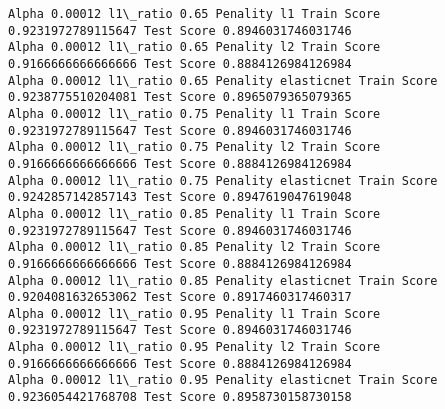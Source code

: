 \documentclass[11pt]{article}
\begin{document}
\begin{Verbatim}[commandchars=\\\{\}]
Alpha 0.00012 l1\_ratio 0.65 Penality l1 Train Score 0.9231972789115647 Test Score 0.8946031746031746
Alpha 0.00012 l1\_ratio 0.65 Penality l2 Train Score 0.9166666666666666 Test Score 0.8884126984126984
Alpha 0.00012 l1\_ratio 0.65 Penality elasticnet Train Score 0.9238775510204081 Test Score 0.8965079365079365
Alpha 0.00012 l1\_ratio 0.75 Penality l1 Train Score 0.9231972789115647 Test Score 0.8946031746031746
Alpha 0.00012 l1\_ratio 0.75 Penality l2 Train Score 0.9166666666666666 Test Score 0.8884126984126984
Alpha 0.00012 l1\_ratio 0.75 Penality elasticnet Train Score 0.9242857142857143 Test Score 0.8947619047619048
Alpha 0.00012 l1\_ratio 0.85 Penality l1 Train Score 0.9231972789115647 Test Score 0.8946031746031746
Alpha 0.00012 l1\_ratio 0.85 Penality l2 Train Score 0.9166666666666666 Test Score 0.8884126984126984
Alpha 0.00012 l1\_ratio 0.85 Penality elasticnet Train Score 0.9204081632653062 Test Score 0.8917460317460317
Alpha 0.00012 l1\_ratio 0.95 Penality l1 Train Score 0.9231972789115647 Test Score 0.8946031746031746
Alpha 0.00012 l1\_ratio 0.95 Penality l2 Train Score 0.9166666666666666 Test Score 0.8884126984126984
Alpha 0.00012 l1\_ratio 0.95 Penality elasticnet Train Score 0.9236054421768708 Test Score 0.8958730158730158

    \end{Verbatim}
\end{document}
